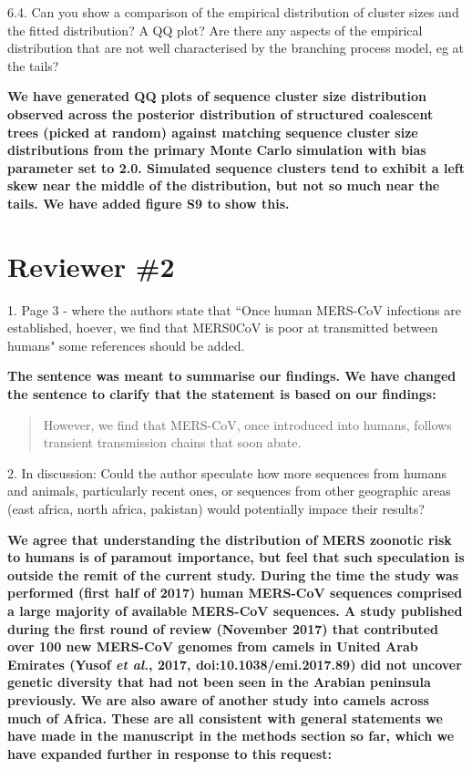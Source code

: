 \documentclass[11pt,oneside,letterpaper]{article}
\begin{document}
6.4. Can you show a comparison of the empirical distribution of cluster sizes and the fitted distribution? A QQ plot? Are there any aspects of the empirical distribution that are not well characterised by the branching process model, eg at the tails?

\textbf{We have generated QQ plots of sequence cluster size distribution observed across the posterior distribution of structured coalescent trees (picked at random) against matching sequence cluster size distributions from the primary Monte Carlo simulation with bias parameter set to 2.0. Simulated sequence clusters tend to exhibit a left skew near the middle of the distribution, but not so much near the tails. We have added figure S9 to show this.}


\section*{Reviewer \#2}

1. Page 3 - where the authors state that ``Once human MERS-CoV infections are established, hoever, we find that MERS0CoV is poor at transmitted between humans" some references should be added.

\textbf{The sentence was meant to summarise our findings. We have changed the sentence to clarify that the statement is based on our findings:}

\begin{quotation}
However, we find that MERS-CoV, once introduced into humans, follows transient transmission chains that soon abate.
\end{quotation}

2. In discussion: Could the author speculate how more sequences from humans and animals, particularly recent ones, or sequences from other geographic areas (east africa, north africa, pakistan) would potentially impace their results?

\textbf{We agree that understanding the distribution of MERS zoonotic risk to humans is of paramout importance, but feel that such speculation is outside the remit of the current study.
During the time the study was performed (first half of 2017) human MERS-CoV sequences comprised a large majority of available MERS-CoV sequences.
A study published during the first round of review (November 2017) that contributed over 100 new MERS-CoV genomes from camels in United Arab Emirates (Yusof \textit{et al.}, 2017, doi:10.1038/emi.2017.89) did not uncover genetic diversity that had not been seen in the Arabian peninsula previously.
We are also aware of another study into camels across much of Africa.
These are all consistent with general statements we have made in the manuscript in the methods section so far, which we have expanded further in response to this request:}
\end{document}
